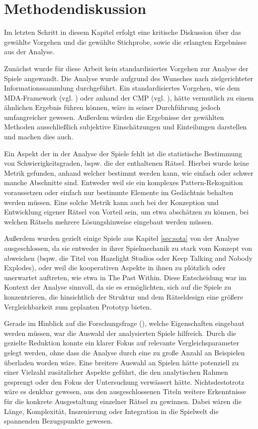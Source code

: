 \section{Methodendiskussion}\label{sec:analysis-discussion}
Im letzten Schritt in diesem Kapitel erfolgt eine kritische Diskussion über das gewählte Vorgehen und die gewählte Stichprobe, sowie die erlangten Ergebnisse aus der Analyse.

Zunächst wurde für diese Arbeit kein standardisiertes Vorgehen zur Analyse der Spiele angewandt. Die Analyse wurde aufgrund des Wunsches nach zielgerichteter Informationssammlung durchgeführt. Ein standardisiertes Vorgehen, wie dem \ac{MDA}-Framework (vgl. \cite{hunicke_mda_2004}) oder anhand der \ac{CMP} (vgl. \cite{seif_el-nasr_understanding_2010}), hätte vermutlich zu einem ähnlichen Ergebnis führen können, wäre in seiner Durchführung jedoch umfangreicher gewesen.
Außerdem würden die Ergebnisse der gewählten Methoden ausschließlich subjektive Einschätzungen und Einteilungen darstellen und machen dies auch.

Ein Aspekt der in der Analyse der Spiele fehlt ist die statistische Bestimmung von Schwierigkeitsgraden, bspw. die der enthaltenen Rätsel. Hierbei wurde keine Metrik gefunden, anhand welcher bestimmt werden kann, wie einfach oder schwer manche Abschnitte sind. Entweder weil sie ein komplexes Pattern-Rekognition voraussetzen oder einfach nur bestimmte Elemente im Gedächtnis behalten werden müssen. Eine solche Metrik kann auch bei der Konzeption und Entwicklung eigener Rätsel von Vorteil sein, um etwa abschätzen zu können, bei welchen Rätseln mehrere Lösungshinweise eingebaut werden müssen.

Außerdem wurden gezielt einige Spiele aus Kapitel \ref{sec:sota} von der Analyse ausgeschlossen, da sie entweder in ihrer Spielmechanik zu stark vom Konzept von  abweichen (bspw. die Titel von Hazelight Studios oder Keep Talking and Nobody Explodes), oder weil die kooperativen Aspekte in ihnen zu plötzlich oder unerwartet auftreten, wie etwa in The Past Within. Diese Entscheidung war im Kontext der Analyse sinnvoll, da sie es ermöglichten, sich auf die Spiele zu konzentrieren, die hinsichtlich der Struktur und dem Rätseldesign eine größere Vergleichbarkeit zum geplanten Prototyp bieten.

Gerade im Hinblick auf die Forschungsfrage (), welche Eigenschaften eingebaut werden müssen, war die Auswahl der analysierten Spiele hilfreich. Durch die gezielte Reduktion konnte ein klarer Fokus auf relevante Vergleichsparameter gelegt werden, ohne dass die Analyse durch eine zu große Anzahl an Beispielen überladen worden wäre. Eine breitere Auswahl an Spielen hätte potenziell zu einer Vielzahl zusätzlicher Aspekte geführt, die den analytischen Rahmen gesprengt oder den Fokus der Untersuchung verwässert hätte.
Nichtsdestotrotz wäre es denkbar gewesen, aus den ausgeschlossenen Titeln weitere Erkenntnisse für die konkrete Ausgestaltung einzelner Rätsel zu gewinnen. Dabei wären die Länge, Komplexität, Inszenierung oder Integration in die Spielwelt die spannenden Bezugspunkte gewesen. 

